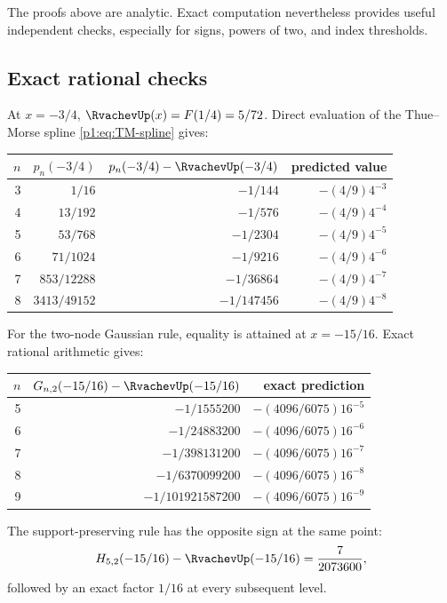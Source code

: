 \documentclass[11pt]{article}
\numberwithin{equation}{section}
\theoremstyle{definition}
\theoremstyle{remark}
\begin{document}
The proofs above are analytic.  Exact computation nevertheless provides useful independent checks, especially for signs, powers of two, and index thresholds.

\subsection{Exact rational checks}

At $x=-3/4$, $\RvachevUp(x)=F(1/4)=5/72$.  Direct evaluation of the Thue--Morse spline \eqref{p1:eq:TM-spline} gives:

\begin{center}
\begin{tabular}{@{}rrrr@{}}
\toprule
$n$ & $p_n(-3/4)$ & $p_n(-3/4)-\RvachevUp(-3/4)$ & predicted value\\
\midrule
3 & $1/16$ & $-1/144$ & $-(4/9)4^{-3}$\\
4 & $13/192$ & $-1/576$ & $-(4/9)4^{-4}$\\
5 & $53/768$ & $-1/2304$ & $-(4/9)4^{-5}$\\
6 & $71/1024$ & $-1/9216$ & $-(4/9)4^{-6}$\\
7 & $853/12288$ & $-1/36864$ & $-(4/9)4^{-7}$\\
8 & $3413/49152$ & $-1/147456$ & $-(4/9)4^{-8}$\\
\bottomrule
\end{tabular}
\end{center}

For the two-node Gaussian rule, equality is attained at $x=-15/16$.  Exact rational arithmetic gives:

\begin{center}
\begin{tabular}{@{}rrr@{}}
\toprule
$n$ & $G_{n,2}(-15/16)-\RvachevUp(-15/16)$ & exact prediction\\
\midrule
5 & $-1/1555200$ & $-(4096/6075)16^{-5}$\\
6 & $-1/24883200$ & $-(4096/6075)16^{-6}$\\
7 & $-1/398131200$ & $-(4096/6075)16^{-7}$\\
8 & $-1/6370099200$ & $-(4096/6075)16^{-8}$\\
9 & $-1/101921587200$ & $-(4096/6075)16^{-9}$\\
\bottomrule
\end{tabular}
\end{center}

The support-preserving rule has the opposite sign at the same point:
\begin{equation}
 H_{5,2}(-15/16)-\RvachevUp(-15/16)=\frac7{2073600},
 \label{p1:eq:H52-check}
\end{equation}
followed by an exact factor $1/16$ at every subsequent level.
\end{document}

